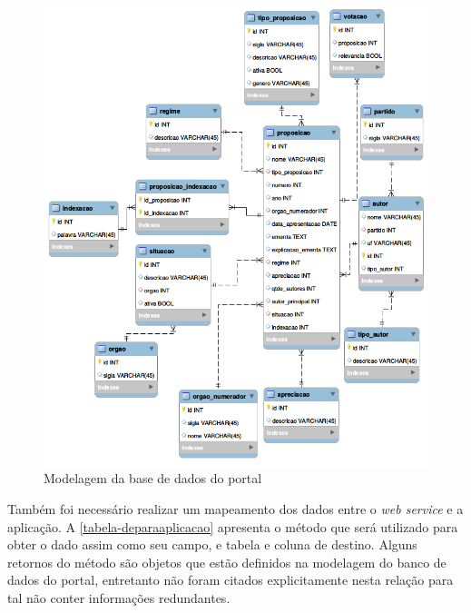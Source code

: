 \documentclass[
	12pt,				%
	openright,			%
	twoside,			%
	a4paper,			%
	english,			%
	french,				%
	spanish,			%
	brazil				%
	]{abntex2}
\begin{document}
\begin{figure}[htb]
	\caption{\label{modelagemeaicongresso}Modelagem da base de dados do portal}
	\begin{center}
	    \includegraphics[scale=0.65]{modeloaicongresso.png}
	\end{center}
	
\end{figure}

Também foi necessário realizar um mapeamento dos dados entre o \emph{web service} e a aplicação. A \autoref{tabela-deparaaplicacao} 
apresenta o método que será utilizado para obter o dado assim como seu campo, e tabela e coluna de destino. Alguns 
retornos do método são objetos que estão definidos na modelagem do banco de dados do portal, entretanto não foram citados explicitamente
nesta relação para tal não conter informações redundantes.
\end{document}
